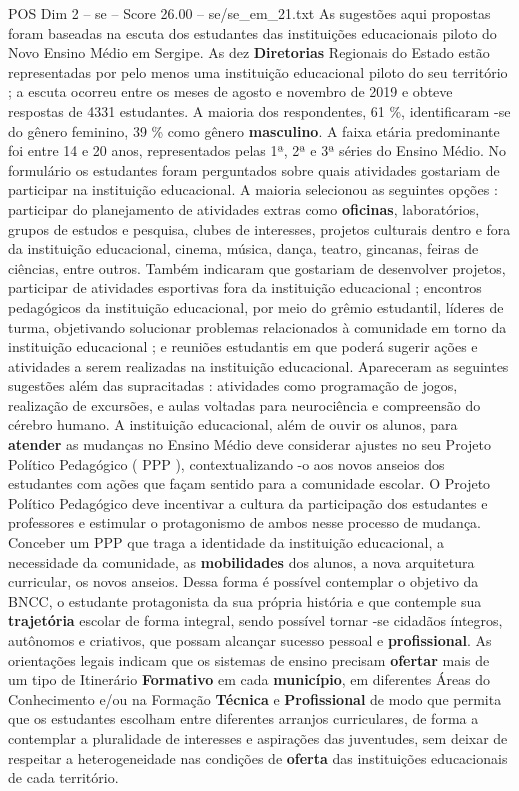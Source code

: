 \begin{textsample}{POS Dim 2 – se – Score 26.00 – se/se\_em\_21.txt}
As sugestões aqui propostas foram baseadas na escuta dos estudantes das instituições educacionais piloto do Novo Ensino Médio em Sergipe.
As dez \textbf{Diretorias} Regionais do Estado estão representadas por pelo menos uma instituição educacional piloto do seu território ; a escuta ocorreu entre os meses de agosto e novembro de 2019 e obteve respostas de 4331 estudantes.
A maioria dos respondentes, 61 \%, identificaram -se do gênero feminino, 39 \% como gênero \textbf{masculino}.
A faixa etária predominante foi entre 14 e 20 anos, representados pelas 1ª, 2ª e 3ª séries do Ensino Médio.
No formulário os estudantes foram perguntados sobre quais atividades gostariam de participar na instituição educacional.
A maioria selecionou as seguintes opções : participar do planejamento de atividades extras como \textbf{oficinas}, laboratórios, grupos de estudos e pesquisa, clubes de interesses, projetos culturais dentro e fora da instituição educacional, cinema, música, dança, teatro, gincanas, feiras de ciências, entre outros.
Também indicaram que gostariam de desenvolver projetos, participar de atividades esportivas fora da instituição educacional ; encontros pedagógicos da instituição educacional, por meio do grêmio estudantil, líderes de turma, objetivando solucionar problemas relacionados à comunidade em torno da instituição educacional ; e reuniões estudantis em que poderá sugerir ações e atividades a serem realizadas na instituição educacional.
Apareceram as seguintes sugestões além das supracitadas : atividades como programação de jogos, realização de excursões, e aulas voltadas para neurociência e compreensão do cérebro humano.
A instituição educacional, além de ouvir os alunos, para \textbf{atender} as mudanças no Ensino Médio deve considerar ajustes no seu Projeto Político Pedagógico ( PPP ), contextualizando -o aos novos anseios dos estudantes com ações que façam sentido para a comunidade escolar.
O Projeto Político Pedagógico deve incentivar a cultura da participação dos estudantes e professores e estimular o protagonismo de ambos nesse processo de mudança.
Conceber um PPP que traga a identidade da instituição educacional, a necessidade da comunidade, as \textbf{mobilidades} dos alunos, a nova arquitetura curricular, os novos anseios.
Dessa forma é possível contemplar o objetivo da BNCC, o estudante protagonista da sua própria história e que contemple sua \textbf{trajetória} escolar de forma integral, sendo possível tornar -se cidadãos íntegros, autônomos e criativos, que possam alcançar sucesso pessoal e \textbf{profissional}.
As orientações legais indicam que os sistemas de ensino precisam \textbf{ofertar} mais de um tipo de Itinerário \textbf{Formativo} em cada \textbf{município}, em diferentes Áreas do Conhecimento e/ou na Formação \textbf{Técnica} e \textbf{Profissional} de modo que permita que os estudantes escolham entre diferentes arranjos curriculares, de forma a contemplar a pluralidade de interesses e aspirações das juventudes, sem deixar de respeitar a heterogeneidade nas condições de \textbf{oferta} das instituições educacionais de cada território.

\end{textsample}
